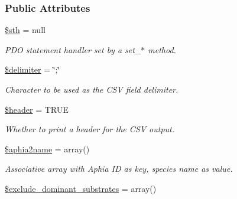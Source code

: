 \subsubsection*{Public Attributes}
\begin{DoxyCompactItemize}
\item 
\hypertarget{classExporter_a910c25744dd81011c43aac920867b291}{\hyperlink{classExporter_a910c25744dd81011c43aac920867b291}{\$sth} = null}\label{classExporter_a910c25744dd81011c43aac920867b291}

\begin{DoxyCompactList}\small\item\em P\-D\-O statement handler set by a set\-\_\-$\ast$ method. \end{DoxyCompactList}\item 
\hypertarget{classExporter_afba79cbecf1307454bafc80a9e442afa}{\hyperlink{classExporter_afba79cbecf1307454bafc80a9e442afa}{\$delimiter} = \char`\"{};\char`\"{}}\label{classExporter_afba79cbecf1307454bafc80a9e442afa}

\begin{DoxyCompactList}\small\item\em Character to be used as the C\-S\-V field delimiter. \end{DoxyCompactList}\item 
\hypertarget{classExporter_a5b5357c605795c38227db7ffdb88ffaa}{\hyperlink{classExporter_a5b5357c605795c38227db7ffdb88ffaa}{\$header} = T\-R\-U\-E}\label{classExporter_a5b5357c605795c38227db7ffdb88ffaa}

\begin{DoxyCompactList}\small\item\em Whether to print a header for the C\-S\-V output. \end{DoxyCompactList}\item 
\hypertarget{classExporter_a2952bce65f130de4ba09e71655bdc89f}{\hyperlink{classExporter_a2952bce65f130de4ba09e71655bdc89f}{\$aphia2name} = array()}\label{classExporter_a2952bce65f130de4ba09e71655bdc89f}

\begin{DoxyCompactList}\small\item\em Associative array with Aphia I\-D as key, species name as value. \end{DoxyCompactList}\item 
\hypertarget{classExporter_af894c7d3f943ae0a52ce33ec8330726a}{\hyperlink{classExporter_af894c7d3f943ae0a52ce33ec8330726a}{\$exclude\-\_\-dominant\-\_\-substrates} = array()}\label{classExporter_af894c7d3f943ae0a52ce33ec8330726a}


\end{DoxyCompactItemize}

